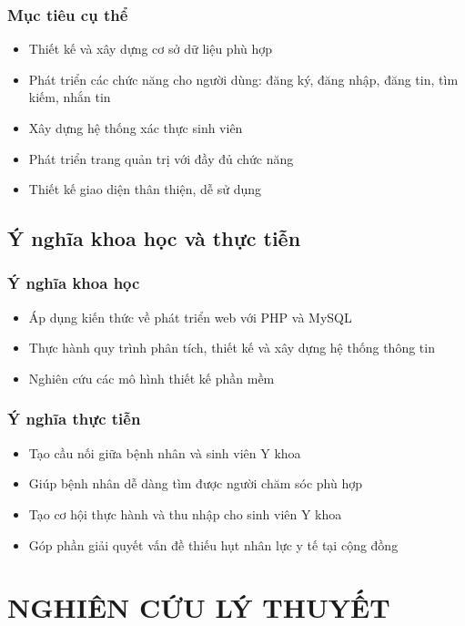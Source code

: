 \documentclass[a4paper,12pt]{report}
\begin{document}
\subsection{Mục tiêu cụ thể}
\begin{itemize}
    \item Thiết kế và xây dựng cơ sở dữ liệu phù hợp
    \item Phát triển các chức năng cho người dùng: đăng ký, đăng nhập, đăng tin, tìm kiếm, nhắn tin
    \item Xây dựng hệ thống xác thực sinh viên
    \item Phát triển trang quản trị với đầy đủ chức năng
    \item Thiết kế giao diện thân thiện, dễ sử dụng
\end{itemize}

\section{Ý nghĩa khoa học và thực tiễn}

\subsection{Ý nghĩa khoa học}
\begin{itemize}
    \item Áp dụng kiến thức về phát triển web với PHP và MySQL
    \item Thực hành quy trình phân tích, thiết kế và xây dựng hệ thống thông tin
    \item Nghiên cứu các mô hình thiết kế phần mềm
\end{itemize}

\subsection{Ý nghĩa thực tiễn}
\begin{itemize}
    \item Tạo cầu nối giữa bệnh nhân và sinh viên Y khoa
    \item Giúp bệnh nhân dễ dàng tìm được người chăm sóc phù hợp
    \item Tạo cơ hội thực hành và thu nhập cho sinh viên Y khoa
    \item Góp phần giải quyết vấn đề thiếu hụt nhân lực y tế tại cộng đồng
\end{itemize}


\chapter{NGHIÊN CỨU LÝ THUYẾT}
\end{document}
